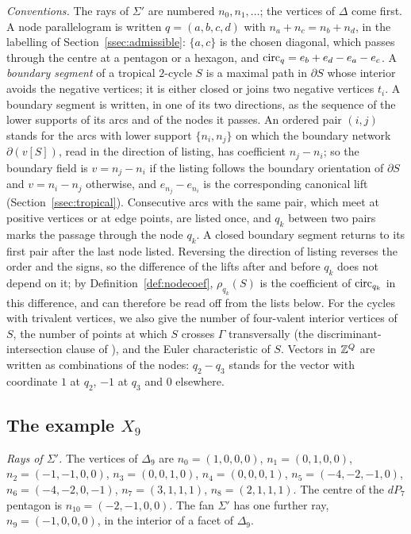 \emph{Conventions.} The rays of $\Sigma'$ are numbered $n_0,n_1,\dots$; the vertices of $\Delta$ come first. A node
parallelogram is written $q=(a,b,c,d)$ with $n_a+n_c=n_b+n_d$, in the labelling of Section~\ref{ssec:admissible}:
$\{a,c\}$ is the chosen diagonal, which passes through the centre at a pentagon or a hexagon, and
$\mathrm{circ}_q=e_b+e_d-e_a-e_c$. A \emph{boundary segment} of a tropical $2$-cycle $S$ is a maximal path in $\partial S$ whose
interior avoids the negative vertices; it is either closed or joins two negative vertices $t_i$. A boundary segment is
written, in one of its two directions, as the sequence of the lower supports of its arcs and of the nodes it passes. An
ordered pair $(i,j)$ stands for the arcs with lower support $\{n_i,n_j\}$ on which the boundary network $\partial(v[S])$,
read in the direction of listing, has coefficient $n_j-n_i$; so the boundary field is $v=n_j-n_i$ if the listing follows
the boundary orientation of $\partial S$ and $v=n_i-n_j$ otherwise, and $e_{n_j}-e_{n_i}$ is the corresponding canonical
lift (Section~\ref{ssec:tropical}). Consecutive arcs with the same pair, which meet at positive vertices or at edge
points, are listed once, and $q_k$ between two pairs marks the passage through the node $q_k$. A closed boundary segment
returns to its first pair after the last node listed. Reversing the direction of listing reverses the order and the
signs, so the difference of the lifts after and before $q_k$ does not depend on it; by Definition~\ref{def:nodecoef},
$\rho_{q_k}(S)$ is the coefficient of $\mathrm{circ}_{q_k}$ in this difference, and can therefore be read off from the lists
below. For the cycles with trivalent vertices, we also give the number of four-valent interior vertices of $S$, the
number of points at which $S$ crosses $\Gamma$ transversally (the discriminant-intersection clause of \cite[Def.~7.2]{CBM}), and the Euler
characteristic of $S$. Vectors in $\mathbb Z^Q$ are written as combinations of the nodes: $q_2-q_3$ stands for the vector with
coordinate $1$ at $q_2$, $-1$ at $q_3$ and $0$ elsewhere.

\begingroup\sloppy
\subsection{The example \texorpdfstring{$X_9$}{X9}}\label{app:data-x9}
\emph{Rays of $\Sigma'$.} The vertices of $\Delta_9$ are $n_{0}=(1,0,0,0)$, $n_{1}=(0,1,0,0)$, $n_{2}=(-1,-1,0,0)$, $n_{3}=(0,0,1,0)$, $n_{4}=(0,0,0,1)$, $n_{5}=(-4,-2,-1,0)$, $n_{6}=(-4,-2,0,-1)$, $n_{7}=(3,1,1,1)$, $n_{8}=(2,1,1,1)$.
 The centre of the $dP_7$ pentagon is $n_{10}=(-2,-1,0,0)$. The fan $\Sigma'$ has one further ray, $n_{9}=(-1,0,0,0)$, in the interior of a facet of $\Delta_9$.

